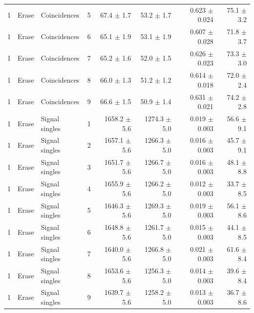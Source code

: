\begin{tabular}{llllrrrr}
1 & Erase & Coincidences & 5 & 67.4 \ensuremath{\pm} 1.7 & 53.2 \ensuremath{\pm} 1.7 & 0.623 \ensuremath{\pm} 0.024 & 75.1 \ensuremath{\pm} 3.2 \\
1 & Erase & Coincidences & 6 & 65.1 \ensuremath{\pm} 1.9 & 53.1 \ensuremath{\pm} 1.9 & 0.607 \ensuremath{\pm} 0.028 & 71.8 \ensuremath{\pm} 3.7 \\
1 & Erase & Coincidences & 7 & 65.2 \ensuremath{\pm} 1.6 & 52.0 \ensuremath{\pm} 1.5 & 0.626 \ensuremath{\pm} 0.023 & 73.3 \ensuremath{\pm} 3.0 \\
1 & Erase & Coincidences & 8 & 66.0 \ensuremath{\pm} 1.3 & 51.2 \ensuremath{\pm} 1.2 & 0.614 \ensuremath{\pm} 0.018 & 72.0 \ensuremath{\pm} 2.4 \\
1 & Erase & Coincidences & 9 & 66.6 \ensuremath{\pm} 1.5 & 50.9 \ensuremath{\pm} 1.4 & 0.631 \ensuremath{\pm} 0.021 & 74.2 \ensuremath{\pm} 2.8 \\
\midrule
1 & Erase & Signal singles & 1 & 1658.2 \ensuremath{\pm} 5.6 & 1274.3 \ensuremath{\pm} 5.0 & 0.019 \ensuremath{\pm} 0.003 & 56.6 \ensuremath{\pm} 9.1 \\
1 & Erase & Signal singles & 2 & 1657.1 \ensuremath{\pm} 5.6 & 1266.3 \ensuremath{\pm} 5.0 & 0.016 \ensuremath{\pm} 0.003 & 45.7 \ensuremath{\pm} 9.1 \\
1 & Erase & Signal singles & 3 & 1651.7 \ensuremath{\pm} 5.6 & 1266.7 \ensuremath{\pm} 5.0 & 0.016 \ensuremath{\pm} 0.003 & 48.1 \ensuremath{\pm} 8.8 \\
1 & Erase & Signal singles & 4 & 1655.9 \ensuremath{\pm} 5.6 & 1266.2 \ensuremath{\pm} 5.0 & 0.012 \ensuremath{\pm} 0.003 & 33.7 \ensuremath{\pm} 8.5 \\
1 & Erase & Signal singles & 5 & 1646.3 \ensuremath{\pm} 5.6 & 1269.3 \ensuremath{\pm} 5.0 & 0.019 \ensuremath{\pm} 0.003 & 56.1 \ensuremath{\pm} 8.6 \\
1 & Erase & Signal singles & 6 & 1648.8 \ensuremath{\pm} 5.6 & 1261.7 \ensuremath{\pm} 5.0 & 0.015 \ensuremath{\pm} 0.003 & 44.1 \ensuremath{\pm} 8.5 \\
1 & Erase & Signal singles & 7 & 1640.0 \ensuremath{\pm} 5.6 & 1266.8 \ensuremath{\pm} 5.0 & 0.021 \ensuremath{\pm} 0.003 & 61.6 \ensuremath{\pm} 8.4 \\
1 & Erase & Signal singles & 8 & 1653.6 \ensuremath{\pm} 5.6 & 1256.3 \ensuremath{\pm} 5.0 & 0.014 \ensuremath{\pm} 0.003 & 39.6 \ensuremath{\pm} 8.4 \\
1 & Erase & Signal singles & 9 & 1639.7 \ensuremath{\pm} 5.6 & 1258.2 \ensuremath{\pm} 5.0 & 0.013 \ensuremath{\pm} 0.003 & 36.7 \ensuremath{\pm} 8.6 \\
\bottomrule
\end{tabular}
